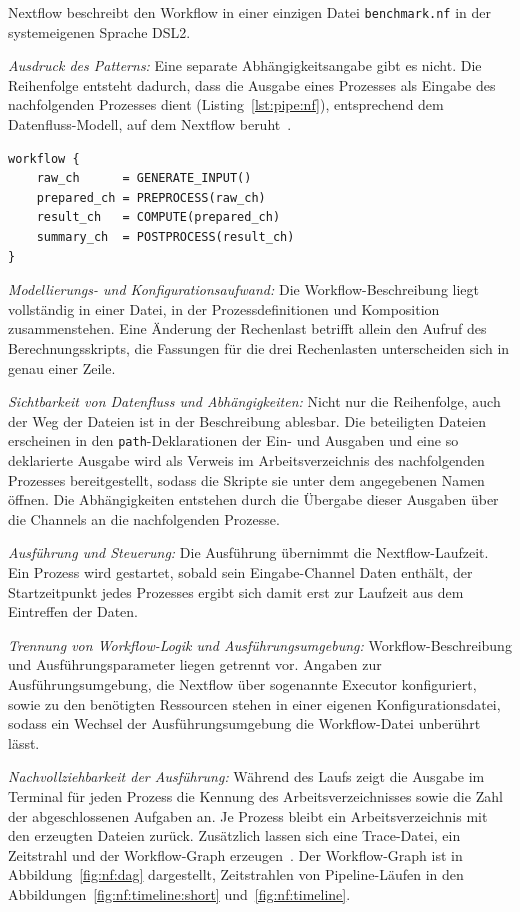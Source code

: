 Nextflow beschreibt den Workflow in einer einzigen Datei
\texttt{benchmark.nf} in der systemeigenen Sprache DSL2.

\emph{Ausdruck des Patterns:} Eine separate Abhängigkeitsangabe gibt
es nicht. Die Reihenfolge entsteht dadurch, dass die Ausgabe eines
Prozesses als Eingabe des nachfolgenden Prozesses dient (Listing~\ref{lst:pipe:nf}), entsprechend
dem Datenfluss-Modell, auf dem Nextflow
beruht~\cite[S.~317]{ditommaso2017nextflow}.

\begin{lstlisting}[caption={workflow-Block aus benchmark.nf (Nextflow, Pipeline)},label={lst:pipe:nf}]
workflow {
    raw_ch      = GENERATE_INPUT()
    prepared_ch = PREPROCESS(raw_ch)
    result_ch   = COMPUTE(prepared_ch)
    summary_ch  = POSTPROCESS(result_ch)
}
\end{lstlisting}

\emph{Modellierungs- und Konfigurationsaufwand:} Die
Workflow-Beschreibung liegt vollständig in einer Datei, in der
Prozessdefinitionen und Komposition zusammenstehen. Eine Änderung der
Rechenlast betrifft allein den Aufruf des Berechnungsskripts, die
Fassungen für die drei Rechenlasten unterscheiden sich in genau einer
Zeile.

\emph{Sichtbarkeit von Datenfluss und Abhängigkeiten:} Nicht nur die
Reihenfolge, auch der Weg der Dateien ist in der Beschreibung
ablesbar. Die beteiligten Dateien erscheinen in den
\texttt{path}-Deklarationen der Ein- und Ausgaben und eine so
deklarierte Ausgabe wird als Verweis im Arbeitsverzeichnis des
nachfolgenden Prozesses bereitgestellt, sodass die Skripte sie unter
dem angegebenen Namen öffnen. Die Abhängigkeiten entstehen durch die
Übergabe dieser Ausgaben über die Channels an die nachfolgenden
Prozesse.

\emph{Ausführung und Steuerung:} Die Ausführung übernimmt die
Nextflow-Laufzeit. Ein Prozess wird gestartet, sobald sein
Eingabe-Channel Daten enthält, der Startzeitpunkt jedes Prozesses ergibt sich damit erst zur Laufzeit aus dem Eintreffen der Daten.

\emph{Trennung von Workflow-Logik und Ausführungsumgebung:}
Workflow-Beschreibung und Ausführungsparameter liegen getrennt vor.
Angaben zur Ausführungsumgebung, die Nextflow über sogenannte
Executor konfiguriert, sowie zu den benötigten Ressourcen stehen in
einer eigenen Konfigurationsdatei, sodass ein Wechsel der
Ausführungsumgebung die Workflow-Datei unberührt lässt.


\emph{Nachvollziehbarkeit der Ausführung:} Während des Laufs zeigt die
Ausgabe im Terminal für jeden Prozess die Kennung des
Arbeitsverzeichnisses sowie die Zahl der abgeschlossenen Aufgaben an.
Je Prozess bleibt ein Arbeitsverzeichnis mit den erzeugten Dateien
zurück. Zusätzlich lassen sich eine Trace-Datei, ein Zeitstrahl und
der Workflow-Graph erzeugen~\cite{nextflowdocs-reports}. Der Workflow-Graph ist in
Abbildung~\ref{fig:nf:dag} dargestellt, Zeitstrahlen von
Pipeline-Läufen in den Abbildungen~\ref{fig:nf:timeline:short}
und~\ref{fig:nf:timeline}.


